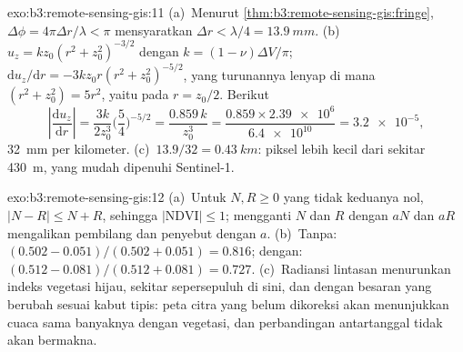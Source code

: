 \begin{solution}{exo:b3:remote-sensing-gis:11}
(a)~Menurut \cref{thm:b3:remote-sensing-gis:fringe}, $\Delta\phi =
4\pi\Delta r/\lambda < \pi$ mensyaratkan $\Delta r < \lambda/4 =
\qty{13.9}{mm}$. (b)~$u_z = k z_0(r^2 + z_0^2)^{-3/2}$ dengan $k = (1 -
\nu)\Delta V/\pi$; $\mathrm du_z/\mathrm dr = -3kz_0r(r^2 + z_0^2)^{-5/2}$,
yang turunannya lenyap di mana $(r^2 + z_0^2) = 5r^2$, yaitu pada $r = z_0/2$. Berikut
\[
\left|\frac{\mathrm du_z}{\mathrm dr}\right| = \frac{3k}{2z_0^3}\Big(\frac54\Big)^{-5/2}
= \frac{0.859\,k}{z_0^3} = \frac{0.859\times\num{2.39e6}}{\num{6.4e10}} = \num{3.2e-5},
\]
\qty{32}{mm} per kilometer. (c)~$13.9/32 = \qty{0.43}{km}$: piksel lebih kecil
dari sekitar \qty{430}{m}, yang mudah dipenuhi Sentinel-1.
\end{solution}

\begin{solution}{exo:b3:remote-sensing-gis:12}
(a)~Untuk $N, R \ge 0$ yang tidak keduanya nol, $|N - R| \le N + R$, sehingga $|\mathrm{NDVI}|
\le 1$; mengganti $N$ dan $R$ dengan $aN$ dan $aR$ mengalikan pembilang dan
penyebut dengan $a$. (b)~Tanpa: $(0.502 - 0.051)/(0.502 + 0.051) =
0.816$; dengan: $(0.512 - 0.081)/(0.512 + 0.081) = 0.727$. (c)~Radiansi lintasan
menurunkan indeks vegetasi hijau, sekitar sepersepuluh di sini, dan
dengan besaran yang berubah sesuai kabut tipis: peta citra yang belum dikoreksi akan
menunjukkan cuaca sama banyaknya dengan vegetasi, dan perbandingan antartanggal
tidak akan bermakna.
\end{solution}

